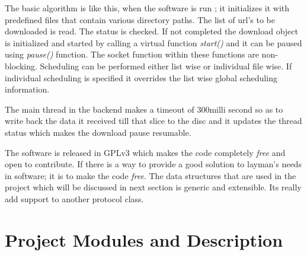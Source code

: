 \documentclass[pdftex,12pt,a4paper,pdfencoding=unicode]{article}
\begin{document}
\begin{onehalfspace}
      The basic algorithm is like this, when the software is run ; it initializes it with predefined files that contain various directory
      paths. The list of url's to be downloaded is read. The status is checked. If not completed the download object is initialized and
      started by calling a virtual function \emph{start()} and it can be paused using \emph{pause()} function. The socket function within
      these functions are non-blocking. Scheduling can be performed either list wise or individual file wise. If individual scheduling is
      specified it overrides the list wise global scheduling information.

      The main thread in the backend makes a timeout of 300milli second so as to write back the data it received till that slice to the
      disc and it updates the thread status which makes the download pause resumable.

      The software is released in GPLv3 which makes the code completely \emph{free} and open to contribute. If there is a way to provide
      a good solution to layman's needs in software; it is to make the code \emph{free}. The data structures that are used in the project
      which will be discussed in next section is generic and extensible. Its really add support to another protocol class.
      \newpage
      \section{Project Modules and Description}
\end{onehalfspace}
\end{document}
